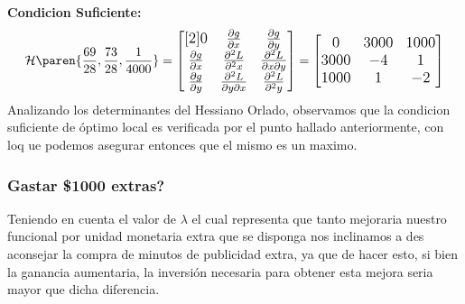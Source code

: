 \begin{homeworkProblem}[-1][Publicidad]
\textbf{Condicion Suficiente:}\\
\begin{align*}
    \mathcal{H}\paren{\frac{69}{28},\frac{73}{28},\frac{1}{4000}}=
    \large{\begin{bmatrix}[2]
        0 & \frac{\partial g}{\partial x}  & \frac{\partial g}{\partial y} \\
         \frac{\partial g}{\partial x}  & \frac{\partial^2 L}{\partial^2 x} & \frac{\partial^2 L}{\partial x \partial y} \\
         \frac{\partial g}{\partial y} & \frac{\partial^2 L}{\partial y \partial x}& \frac{\partial^2 L }{\partial^2 y } 
    \end{bmatrix}} = \begin{bmatrix}
       0 & 3000 & 1000 \\
       3000 & -4 & 1 \\
       1000 & 1 & -2
    \end{bmatrix}
\end{align*}
Analizando los determinantes del Hessiano Orlado, observamos que la condicion suficiente de óptimo local es verificada por el punto hallado anteriormente, con loq ue podemos asegurar entonces que el mismo es un maximo.

\subsubsection{Gastar \$1000 extras?}
Teniendo en cuenta el valor de $\lambda$ el cual representa que tanto mejoraria nuestro funcional por unidad monetaria extra que se disponga
nos inclinamos a des aconsejar la compra de minutos de publicidad extra, ya que de hacer esto, si bien la ganancia aumentaria, la inversión necesaria para obtener esta mejora seria mayor que dicha diferencia.

\end{homeworkProblem}